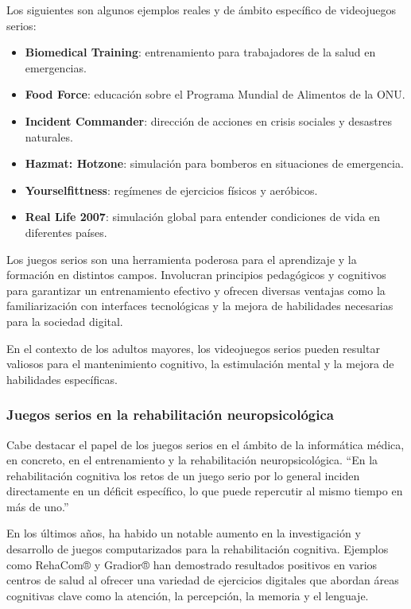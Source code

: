 Los siguientes son algunos ejemplos reales y de ámbito específico de videojuegos serios:
\begin{itemize}[leftmargin=1.5cm, topsep=2.2pt, itemsep=1pt]
    \item \textbf{Biomedical Training}: entrenamiento para trabajadores de la salud en emergencias.
    \item \textbf{Food Force}: educación sobre el Programa Mundial de Alimentos de la ONU.
    \item \textbf{Incident Commander}: dirección de acciones en crisis sociales y desastres naturales.
    \item \textbf{Hazmat: Hotzone}: simulación para bomberos en situaciones de emergencia.
    \item \textbf{Yourselfittness}: regímenes de ejercicios físicos y aeróbicos.
    \item \textbf{Real Life 2007}: simulación global para entender condiciones de vida en diferentes países.
\end{itemize}

Los juegos serios son una herramienta poderosa para el aprendizaje y la formación en distintos campos. Involucran principios pedagógicos y cognitivos para garantizar un entrenamiento efectivo y ofrecen diversas ventajas como la familiarización con interfaces tecnológicas y la mejora de habilidades necesarias para la sociedad digital.

En el contexto de los adultos mayores, los videojuegos serios pueden resultar valiosos para el mantenimiento cognitivo, la estimulación mental y la mejora de habilidades específicas.

\newpage
\subsubsection{Juegos serios en la rehabilitación neuropsicológica}

Cabe destacar el papel de los juegos serios en el ámbito de la informática médica, en concreto, en el entrenamiento y la rehabilitación neuropsicológica.  \enquote{En la rehabilitación cognitiva los retos de un juego serio por lo general inciden directamente en un déficit específico, lo que puede repercutir al mismo tiempo en más de uno.} \parencite{juegosSerios2} 

En los últimos años, ha habido un notable aumento en la investigación y desarrollo de juegos computarizados para la rehabilitación cognitiva. Ejemplos como RehaCom® y Gradior® \parencite{ICTestudios} han demostrado resultados positivos en varios centros de salud al ofrecer una variedad de ejercicios digitales que abordan áreas cognitivas clave como la atención, la percepción, la memoria y el lenguaje. 

